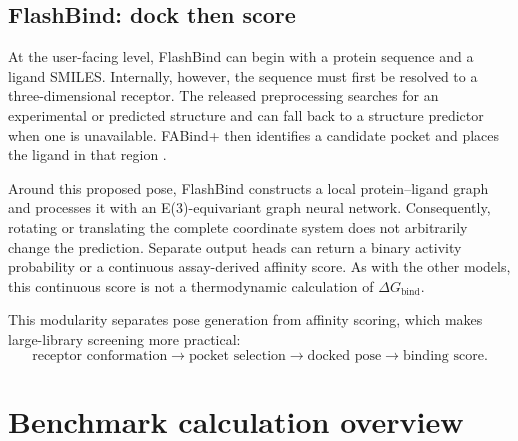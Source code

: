 \documentclass[11pt]{article}
\begin{document}
\subsection{FlashBind: dock then score}

At the user-facing level, FlashBind can begin with a protein sequence and a
ligand SMILES. Internally, however, the sequence must first be resolved to a
three-dimensional receptor. The released preprocessing searches for an
experimental or predicted structure and can fall back to a structure
predictor when one is unavailable. FABind+ then identifies a candidate pocket
and places the ligand in that region \citep{jiang2026flashbind}.

Around this proposed pose, FlashBind constructs a local protein--ligand graph
and processes it with an E(3)-equivariant graph neural network. Consequently,
rotating or translating the complete coordinate system does not arbitrarily
change the prediction. Separate output heads can return a binary activity
probability or a continuous assay-derived affinity score. As with the other
models, this continuous score is not a thermodynamic calculation of
$\Delta G_{\mathrm{bind}}$.

This modularity separates pose generation from affinity scoring, which makes
large-library screening more practical:
\[
 \text{receptor conformation}
 \longrightarrow \text{pocket selection}
 \longrightarrow \text{docked pose}
 \longrightarrow \text{binding score}.
\]


\begin{center}
\setlength{\fboxsep}{8pt}
\end{center}

\section{Benchmark calculation overview}
\end{document}
